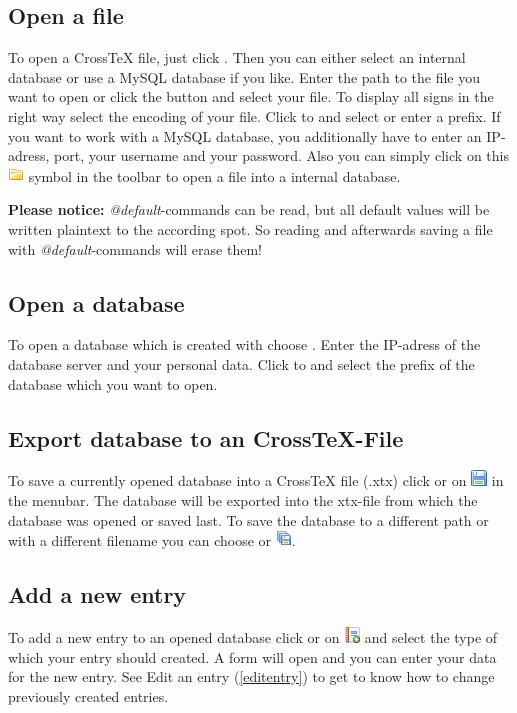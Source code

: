 \documentclass[a4paper,10pt]{scrartcl}
\begin{document}
\subsection{Open a file}
To open a CrossTeX file, just click \clickpath{\file}{\openfile}.
Then you can either select an internal database or use a MySQL database if you
like. Enter the path to the file you want to open or click the \browse button
and select your file. To display all signs in the right way select the encoding
of your file. Click to \connectdb and select or enter a prefix. If you want to
work with a MySQL database, you additionally have to enter an IP-adress, port,
your username and your password.
Also you can simply click on this \includegraphics{../../images/folder.png}
 symbol in the toolbar to open a file into a internal database.
 
\textbf{Please notice:} \textit{@default}-commands can be read, but all default
values will be written plaintext to the according spot. So reading and
afterwards saving a file with \textit{@default}-commands will erase them!
\subsection{Open a database}
To open a database which is created with \crossrefx choose
\clickpath{\file}{\openfile}. Enter the IP-adress of the database server and
your personal data. Click to \connectdb and select the prefix of the database
which you want to open.
\subsection{Export database to an CrossTeX-File}
To save a currently opened database into a CrossTeX file (.xtx) click
\clickpath{\file}{\exportdatabase} or on \includegraphics{../../images/disk.png}
in the menubar. The database will be exported into the xtx-file from which the
database was opened or saved last. To save the database to a different path or
with a different filename you can choose \clickpath{\file}{\exportdatabaseas} or
\includegraphics{../../images/disk_multiple.png}.
\subsection{Add a new entry}
To add a new entry to an opened database click \clickpath{\edit}{\newentry} or
on \includegraphics{../../images/report_add.png} and select the type of which
your entry should created. A form will open and you can enter your data for the
new entry.
See Edit an entry (\ref{editentry}) to get to know how to change previously
created entries.
\end{document}
